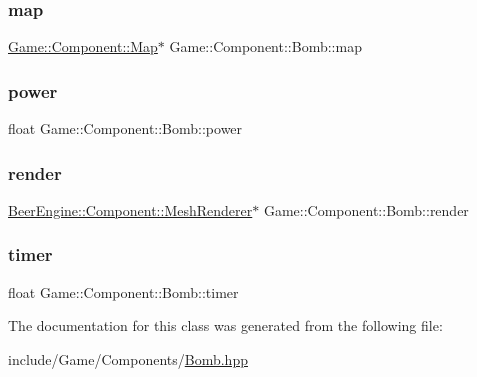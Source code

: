 \subsubsection{\texorpdfstring{map}{map}}
{\footnotesize\ttfamily \mbox{\hyperlink{class_game_1_1_component_1_1_map}{Game\+::\+Component\+::\+Map}}$\ast$ Game\+::\+Component\+::\+Bomb\+::map}

\mbox{\label{class_game_1_1_component_1_1_bomb_a0e4068ea1fe8146c412c76f472db7087}} 
\subsubsection{\texorpdfstring{power}{power}}
{\footnotesize\ttfamily float Game\+::\+Component\+::\+Bomb\+::power}

\mbox{\label{class_game_1_1_component_1_1_bomb_ae70ae4cc38793d675183efa64ac25f36}} 
\subsubsection{\texorpdfstring{render}{render}}
{\footnotesize\ttfamily \mbox{\hyperlink{class_beer_engine_1_1_component_1_1_mesh_renderer}{Beer\+Engine\+::\+Component\+::\+Mesh\+Renderer}}$\ast$ Game\+::\+Component\+::\+Bomb\+::render\hspace{0.3cm}{\ttfamily [protected]}}

\mbox{\label{class_game_1_1_component_1_1_bomb_a4c1dc12e98181874a406edd83b98ffa1}} 
\subsubsection{\texorpdfstring{timer}{timer}}
{\footnotesize\ttfamily float Game\+::\+Component\+::\+Bomb\+::timer\hspace{0.3cm}{\ttfamily [protected]}}



The documentation for this class was generated from the following file\+:\begin{DoxyCompactItemize}
\item 
include/\+Game/\+Components/\mbox{\hyperlink{_bomb_8hpp}{Bomb.\+hpp}}\end{DoxyCompactItemize}
